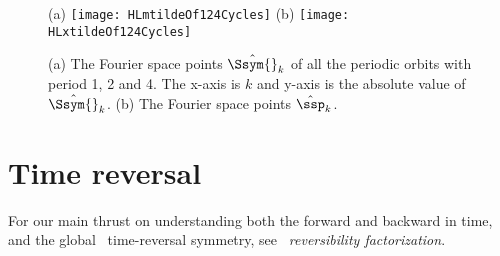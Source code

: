 \begin{description}
\begin{figure}
  \centering
(a) \texttt{[image: HLmtildeOf124Cycles]}
(b) \texttt{[image: HLxtildeOf124Cycles]}
  \caption{\label{fig:HLmtildeAndxtildeOf124Cycles}
(a)
    The Fourier space points $\hat{\Ssym{}}_{k}$ of all the periodic orbits
    with period 1, 2 and 4. The x-axis is $k$ and y-axis is the absolute value
    of $\hat{\Ssym{}}_{k}$.
(b) The Fourier space points $\hat{\ssp}_{k}$.
}
\end{figure}



\end{description}

\section{Time reversal}
\label{sect:timeRev}

For our main thrust on understanding both the forward and backward in
time, and the global \templatt\ time-reversal symmetry, see
 {\em \tempLatt\ reversibility factorization}.


